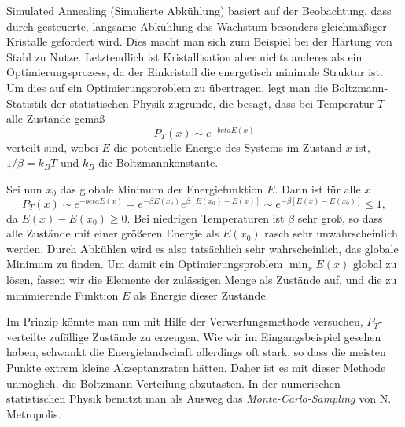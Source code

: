 Simulated Annealing (Simulierte Abkühlung) basiert auf der
Beobachtung, dass durch gesteuerte, langsame Abkühlung das Wachstum
besonders gleichmäßiger Kristalle gefördert wird. Dies macht man sich
zum Beispiel bei der Härtung von Stahl zu Nutze. Letztendlich ist
Kristallisation aber nichts anderes als ein Optimierungsprozess, da
der Einkristall die energetisch minimale Struktur ist. Um dies auf ein
Optimierungsproblem zu übertragen, legt man die Boltzmann-Statistik
der statistischen Physik zugrunde, die besagt, dass bei Temperatur $T$
alle Zustände gemäß
\begin{equation}
  P_T(x)\sim e^{-beta E(x)}
\end{equation}
verteilt sind, wobei $E$ die potentielle Energie des Systems im
Zustand $x$ ist, $1/\beta=k_BT$ und $k_B$ die
Boltzmannkonstante.

Sei nun $x_0$ das globale Minimum der Energiefunktion $E$. Dann ist
für alle $x$
\begin{equation}
  P_T(x)\sim e^{-beta E(x)} = e^{-\beta E(x_o)}e^{\beta [E(x_0) - E(x)]}
  \sim e^{-\beta [E(x) - E(x_0)]} \le 1,
\end{equation}
da $E(x) - E(x_0)\ge 0$. Bei niedrigen Temperaturen ist $\beta$ sehr
groß, so dass alle Zustände mit einer größeren Energie als $E(x_0)$
rasch sehr unwahrscheinlich werden. Durch Abkühlen wird es also
tatsächlich sehr wahrscheinlich, das globale Minimum zu finden. Um
damit ein Optimierungsproblem $\min_{x} E(x)$ global zu lösen, fassen
wir die Elemente der zulässigen Menge als Zustände auf, und die zu
minimierende Funktion $E$ als Energie dieser Zustände.

Im Prinzip könnte man nun mit Hilfe der Verwerfungsmethode versuchen,
$P_T$-verteilte zufällige Zustände zu erzeugen. Wie wir im
Eingangsbeispiel gesehen haben, schwankt die Energielandschaft
allerdings oft stark, so dass die meisten Punkte extrem kleine
Akzeptanzraten hätten. Daher ist es mit dieser Methode unmöglich, die
Boltzmann-Verteilung abzutasten. In der numerischen statistischen
Physik benutzt man als Ausweg das \emph{Monte-Carlo-Sampling} von
N. Metropolis.

